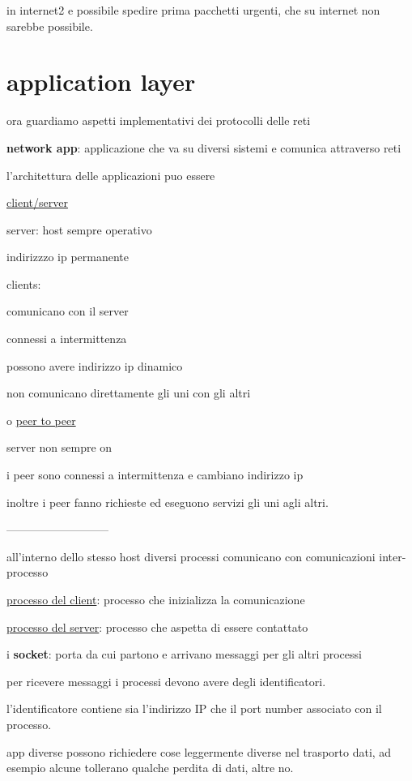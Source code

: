 \documentclass[12pt]{article}
\begin{document}
in internet2 e possibile spedire prima pacchetti urgenti, che su internet non sarebbe possibile.




\section{application layer}


ora guardiamo aspetti implementativi dei protocolli delle reti

\textbf{network app}: applicazione che  va su diversi sistemi e comunica attraverso reti

l'architettura delle applicazioni puo essere

\underline{client/server}

server:
host sempre operativo

indirizzzo ip permanente


clients:

comunicano con il server

connessi a intermittenza

possono avere indirizzo ip dinamico

non comunicano direttamente gli uni con gli altri

o \underline{peer to peer}

server non sempre on

i peer sono connessi a intermittenza e cambiano indirizzo ip

inoltre i peer fanno richieste ed eseguono servizi gli uni agli altri.

---------------------------

all'interno dello stesso host diversi processi  comunicano con comunicazioni inter-processo

\underline{processo del client}: processo che inizializza la comunicazione

\underline{processo del server}: processo che aspetta di essere contattato


i \textbf{socket}: porta da cui partono e arrivano messaggi per gli altri processi


per ricevere messaggi i processi devono avere degli identificatori.

l'identificatore contiene sia l'indirizzo IP che il port number associato con il processo.


app diverse possono richiedere cose leggermente diverse nel trasporto dati, ad esempio alcune tollerano qualche perdita di dati, altre no.
\end{document}
